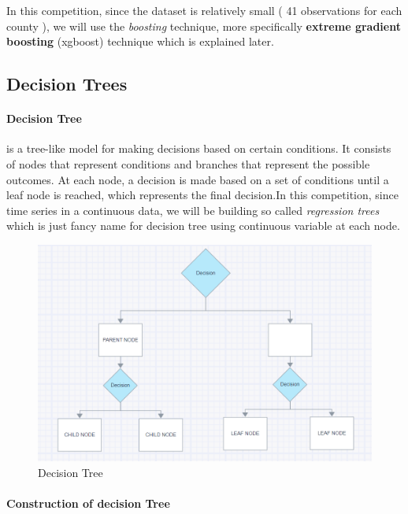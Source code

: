 \documentclass{article}
\begin{document}
\vspace{1em}
In this competition, since the dataset is relatively small ( 41 observations for each county ), we will use the \textit{boosting} technique, more specifically \textbf{extreme gradient boosting} (xgboost) technique which is explained later.

\subsection{Decision Trees}
\vspace{1em}



\paragraph{Decision Tree} is a tree-like model for making decisions based on certain conditions. It consists of nodes that represent conditions and branches that represent the possible outcomes. At each node, a decision is made based on a set of conditions until a leaf node is reached, which represents the final decision.In this competition, since time series in a continuous data, we will be building so called \textit{regression trees} which is just fancy name for decision tree using continuous variable at each node. 

\newpage
\begin{figure}[h]
	\centering
	\includegraphics[scale=0.6]{images/decision_tree}
	\caption{Decision Tree}
\end{figure}

\vspace{1em}
\paragraph{Construction of decision Tree } 
\end{document}
